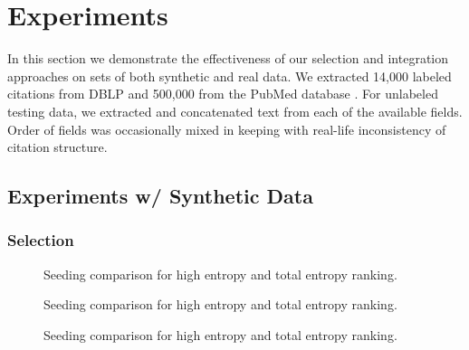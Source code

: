 \section{Experiments}
In this section we demonstrate the effectiveness of our selection and integration approaches on sets of both synthetic and real data.  We extracted 14,000 labeled citations from DBLP  and 500,000 from the PubMed database .  For unlabeled testing data, we extracted and concatenated text from each of the available fields.  Order of fields was occasionally mixed in keeping with real-life inconsistency of citation structure.

\subsection{Experiments w/ Synthetic Data}
\subsubsection{Selection}

\begin{figure*}[t]
	\centering
	\caption{Seeding comparison for high entropy and total entropy ranking.}
	\label{figure:selection1}
\end{figure*}

\begin{figure*}[t]
	\centering
	\caption{Seeding comparison for high entropy and total entropy ranking.}
	\label{figure:selection1}
\end{figure*}

\begin{figure*}[t]
	\centering
	\caption{Seeding comparison for high entropy and total entropy ranking.}
	\label{figure:selection1}
\end{figure*}




